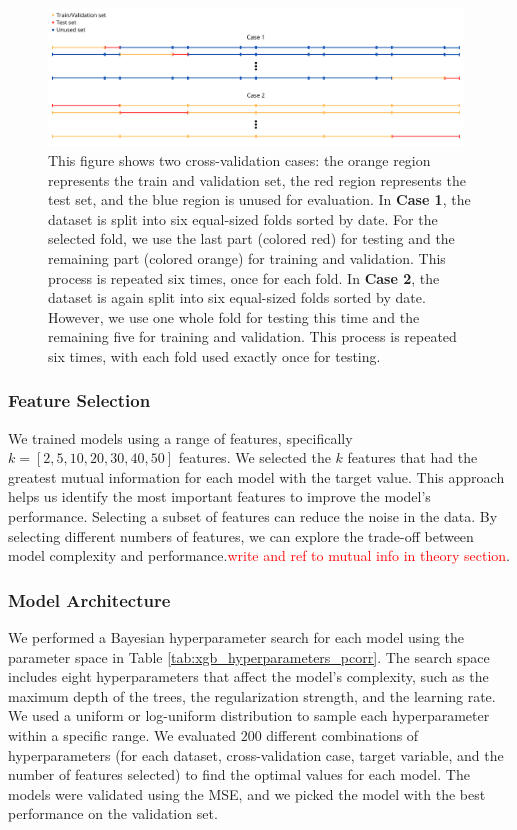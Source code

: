 \begin{figure}[H]
    \centering
    \includegraphics[width=0.98\textwidth]{Canva/datasplits.png}
    \caption{This figure shows two cross-validation cases: the orange region represents the train and validation set, the red region represents the test set, and the blue region is unused for evaluation.
    In \textbf{Case 1}, the dataset is split into six equal-sized folds sorted by date.
    For the selected fold, we use the last part (colored red) for testing and the remaining part (colored orange) for training and validation.
    This process is repeated six times, once for each fold.
    In \textbf{Case 2}, the dataset is again split into six equal-sized folds sorted by date.
    However, we use one whole fold for testing this time and the remaining five for training and validation.
    This process is repeated six times, with each fold used exactly once for testing.}
    \label{fig:datasplit_cases}
\end{figure}




\subsubsection{Feature Selection}
We trained models using a range of features, specifically $k=[2,5,10,20,30,40,50]$ features.
We selected the $k$ features that had the greatest mutual information for each model with the target value.
This approach helps us identify the most important features to improve the model's performance. Selecting a subset of features can reduce the noise in the data. 
By selecting different numbers of features, we can explore the trade-off between model complexity and performance.\textcolor{red}{write and ref to mutual info in theory section}.

\subsubsection{Model Architecture}
We performed a Bayesian hyperparameter search for each model using the parameter space in Table \ref{tab:xgb_hyperparameters_pcorr}.
The search space includes eight hyperparameters that affect the model's complexity, such as the maximum depth of the trees, the regularization strength, and the learning rate.
We used a uniform or log-uniform distribution to sample each hyperparameter within a specific range.
We evaluated $200$ different combinations of hyperparameters (for each dataset, cross-validation case, target variable, and the number of features selected) to find the optimal values for each model.
The models were validated using the MSE, and we picked the model with the best performance on the validation set.


